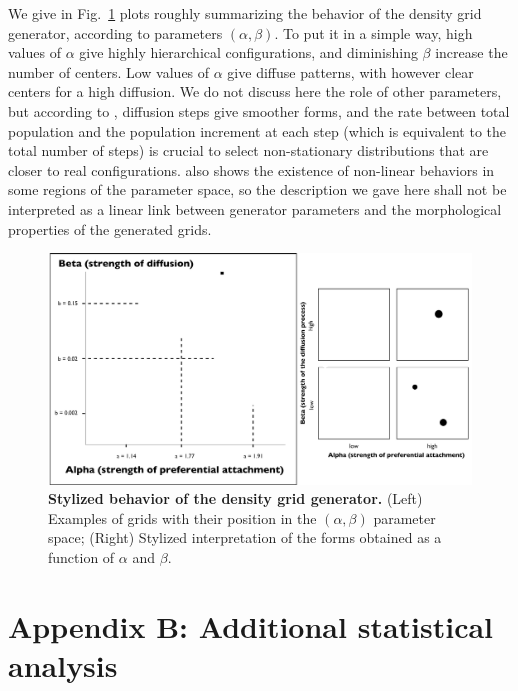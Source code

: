 \documentclass{JASSS}
\begin{document}
We give in Fig.~\ref{fig:stylized-generator} plots roughly summarizing the behavior of the density grid generator, according to parameters $(\alpha,\beta)$. To put it in a simple way, high values of $\alpha$ give highly hierarchical configurations, and diminishing $\beta$ increase the number of centers. Low values of $\alpha$ give diffuse patterns, with however clear centers for a high diffusion. We do not discuss here the role of other parameters, but according to \cite{raimbault2018calibration}, diffusion steps give smoother forms, and the rate between total population and the population increment at each step (which is equivalent to the total number of steps) is crucial to select non-stationary distributions that are closer to real configurations. \cite{raimbault2018calibration} also shows the existence of non-linear behaviors in some regions of the parameter space, so the description we gave here shall not be interpreted as a linear link between generator parameters and the morphological properties of the generated grids.


\begin{figure}[!t]
	\centering
    \includegraphics[width=\textwidth]{figures/Fig7.png}
    \caption{\textbf{Stylized behavior of the density grid generator.} (Left) Examples of grids with their position in the $(\alpha,\beta)$ parameter space; (Right) Stylized interpretation of the forms obtained as a function of $\alpha$ and $\beta$.}\label{fig:stylized-generator}
\end{figure}


\section{Appendix B: Additional statistical analysis}
\end{document}
